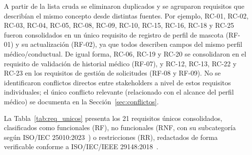 \documentclass[journal,onecolumn]{IEEEtran}
\begin{document}
A partir de la lista cruda se eliminaron duplicados y se agruparon
requisitos que describían el mismo concepto desde distintas fuentes. Por
ejemplo, RC-01, RC-02, RC-03, RC-04, RC-05, RC-08, RC-09, RC-10, RC-15,
RC-16, RC-18 y RC-25 fueron consolidados en un único requisito de registro
de perfil de mascota (RF-01) y su actualización (RF-02), ya que todos
describen campos del mismo perfil médico/conductual. De igual forma,
RC-06, RC-19 y RC-20 se consolidaron en el requisito de validación de
historial médico (RF-07), y RC-12, RC-13, RC-22 y RC-23 en los requisitos
de gestión de solicitudes (RF-08 y RF-09). No se identificaron conflictos
directos entre stakeholders a nivel de estos requisitos individuales; el
único conflicto relevante (relacionado con el alcance del perfil médico) se
documenta en la Sección~\ref{sec:conflictos}.

La Tabla~\ref{tab:req_unicos} presenta los 21 requisitos únicos
consolidados, clasificados como funcionales (RF), no funcionales (RNF, con
su subcategoría según ISO/IEC 25010:2023~\cite{iso25010}) o restricciones
(RR), redactados de forma verificable conforme a
ISO/IEC/IEEE 29148:2018~\cite{iso29148}.
\end{document}
